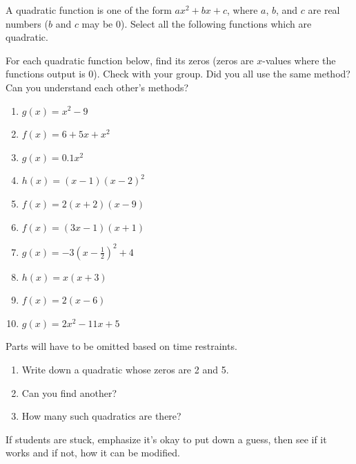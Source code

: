 \documentclass[noauthor,noinstructornotes]{ximera}
\begin{document}
\begin{problem}
A quadratic function is one of the form \(ax^2 + bx + c\), where \(a\),
\(b\), and \(c\) are real numbers (\(b\) and \(c\) may be 0). Select all the 
following functions which are quadratic. 

For each quadratic function below, find its zeros (zeros are 
\(x\)-values where the functions output is 0). Check with your group.
Did you all use the same method? Can you understand each other's methods?

\begin{enumerate}
    \item \(g\left(x\right)=x^2-9\)
    \item \(f\left(x\right)=6+5x+x^2\)
    \item \(g\left(x\right)=0.1x^2\)
    \item \(h\left(x\right)=\left(x-1\right)\left(x-2\right)^2\)
    \item \(f\left(x\right)=2\left(x+2\right)\left(x-9\right)\)
    \item \(f\left(x\right)=\left(3x-1\right)\left(x+1\right)\)
    \item \(g\left(x\right)=-3\left(x-\frac{1}{2}\right)^2+4\)
    \item \(h\left(x\right)=x\left(x+3\right)\)
    \item \(f\left(x\right)=2\left(x-6\right)\)
    \item \(g\left(x\right)=2x^2-11x+5\)
\end{enumerate}

\begin{instructorNotes}
Parts will have to be omitted based on time restraints.
\end{instructorNotes}

\end{problem}

\begin{problem}

\begin{enumerate}
    \item Write down a quadratic whose zeros are 2 and 5.
    \item Can you find another?
    \item How many such quadratics are there?
\end{enumerate}

\begin{instructorNotes}
If students are stuck, emphasize it's okay to put down a guess, then
see if it works and if not, how it can be modified.
\end{instructorNotes}

\end{problem}
\end{document}
